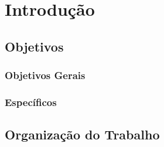\chapter{Introdução}
 

 
 

 
\section{Objetivos}
 

\subsection{Objetivos Gerais}
 

 
 
\subsection{Específicos}

 

 
 
\section{Organização do Trabalho}
 

